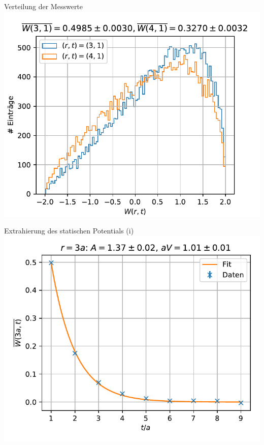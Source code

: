 \documentclass[ngerman]{beamer}
\begin{document}
\begin{frame}{Verteilung der Messwerte}
	\centering
	\includegraphics[width=.8\textwidth]{1x3and4histogramPresentation}
\end{frame}

\begin{frame}{Extrahierung des statischen Potentials (i)}
	\centering
	\includegraphics[width=.8\textwidth]{loopResultsBeta23r3.pdf}
\end{frame}
\end{document}
